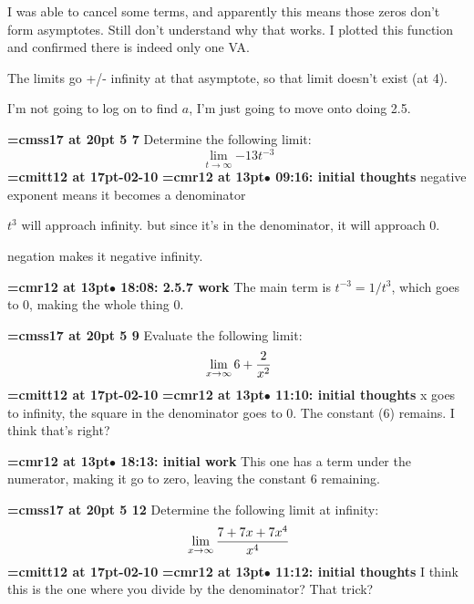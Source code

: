 I was able to cancel some terms, and apparently this means those zeros don't form asymptotes. Still don't understand why that works. I plotted this function and confirmed there is indeed only one VA.
\par

The limits go +/- infinity at that asymptote, so that limit doesn't exist (at 4).
\par

I'm not going to log on to find $a$, I'm just going to move onto doing 2.5.
\par

{\medskip\noindent\bf\font\titlefont=cmss17 at 20pt 5 7}\medskip
Determine the following limit:
$$\
\lim_{t \to \infty}{
-13t^{-3}
}
$$
{\medskip\noindent\bf\font\titlefont=cmitt12 at 17pt-02-10}\medskip
{\smallskip\noindent\bf\font\titlefont=cmr12 at 13pt\titlefont $\bullet$ 09:16: initial thoughts}\smallskip
negative exponent means it becomes a denominator
\par

$t^3$ will approach infinity. but since it's in the denominator, it will approach 0.
\par

negation makes it negative infinity.
\par

{\smallskip\noindent\bf\font\titlefont=cmr12 at 13pt\titlefont $\bullet$ 18:08: 2.5.7 work}\smallskip
The main term is $t^{-3} = 1/t^3$, which goes to 0, making the whole thing 0.
\par

{\medskip\noindent\bf\font\titlefont=cmss17 at 20pt 5 9}\medskip
Evaluate the following limit:
$$\
\lim_{x \to \infty}{
6 + {2 \over x^2}
}
$$
{\medskip\noindent\bf\font\titlefont=cmitt12 at 17pt-02-10}\medskip
{\smallskip\noindent\bf\font\titlefont=cmr12 at 13pt\titlefont $\bullet$ 11:10: initial thoughts}\smallskip
x goes to infinity, the square in the denominator goes to 0. The constant (6) remains. I think that's right?
\par

{\smallskip\noindent\bf\font\titlefont=cmr12 at 13pt\titlefont $\bullet$ 18:13: initial work}\smallskip
This one has a term under the numerator, making it go to zero, leaving the constant 6 remaining.
\par

{\medskip\noindent\bf\font\titlefont=cmss17 at 20pt 5 12}\medskip
Determine the following limit at infinity:
$$\
\lim_{x \to \infty}{
7 + 7x + 7x^4
\over
x^4
}
$$
{\medskip\noindent\bf\font\titlefont=cmitt12 at 17pt-02-10}\medskip
{\smallskip\noindent\bf\font\titlefont=cmr12 at 13pt\titlefont $\bullet$ 11:12: initial thoughts}\smallskip
I think this is the one where you divide by the denominator? That trick?
\par

